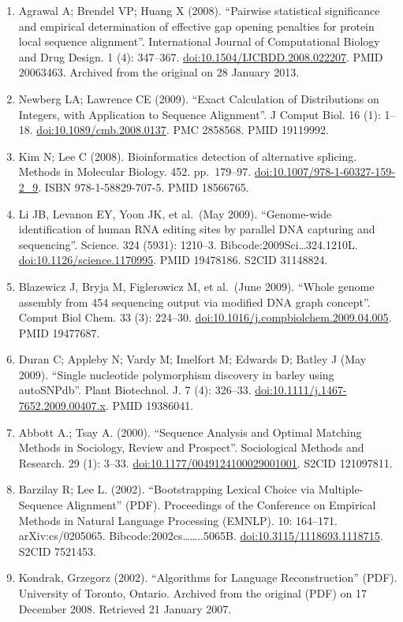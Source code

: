 \documentclass[
]{book}
\begin{document}
\begin{enumerate}
\item
  Agrawal A; Brendel VP; Huang X (2008). ``Pairwise statistical significance and empirical determination of effective gap opening penalties for protein local sequence alignment''. International Journal of Computational Biology and Drug Design. 1 (4): 347--367. \url{doi:10.1504/IJCBDD.2008.022207}. PMID 20063463. Archived from the original on 28 January 2013.
\item
  Newberg LA; Lawrence CE (2009). ``Exact Calculation of Distributions on Integers, with Application to Sequence Alignment''. J Comput Biol. 16 (1): 1--18. \url{doi:10.1089/cmb.2008.0137}. PMC 2858568. PMID 19119992.
\item
  Kim N; Lee C (2008). Bioinformatics detection of alternative splicing. Methods in Molecular Biology. 452. pp.~179--97. \url{doi:10.1007/978-1-60327-159-2_9}. ISBN 978-1-58829-707-5. PMID 18566765.
\item
  Li JB, Levanon EY, Yoon JK, et al.~(May 2009). ``Genome-wide identification of human RNA editing sites by parallel DNA capturing and sequencing''. Science. 324 (5931): 1210--3. Bibcode:2009Sci\ldots324.1210L. \url{doi:10.1126/science.1170995}. PMID 19478186. S2CID 31148824.
\item
  Blazewicz J, Bryja M, Figlerowicz M, et al.~(June 2009). ``Whole genome assembly from 454 sequencing output via modified DNA graph concept''. Comput Biol Chem. 33 (3): 224--30. \url{doi:10.1016/j.compbiolchem.2009.04.005}. PMID 19477687.
\item
  Duran C; Appleby N; Vardy M; Imelfort M; Edwards D; Batley J (May 2009). ``Single nucleotide polymorphism discovery in barley using autoSNPdb''. Plant Biotechnol. J. 7 (4): 326--33. \url{doi:10.1111/j.1467-7652.2009.00407.x}. PMID 19386041.
\item
  Abbott A.; Tsay A. (2000). ``Sequence Analysis and Optimal Matching Methods in Sociology, Review and Prospect''. Sociological Methods and Research. 29 (1): 3--33. \url{doi:10.1177/0049124100029001001}. S2CID 121097811.
\item
  Barzilay R; Lee L. (2002). ``Bootstrapping Lexical Choice via Multiple-Sequence Alignment'' (PDF). Proceedings of the Conference on Empirical Methods in Natural Language Processing (EMNLP). 10: 164--171. arXiv:cs/0205065. Bibcode:2002cs\ldots\ldots..5065B. \url{doi:10.3115/1118693.1118715}. S2CID 7521453.
\item
  Kondrak, Grzegorz (2002). ``Algorithms for Language Reconstruction'' (PDF). University of Toronto, Ontario. Archived from the original (PDF) on 17 December 2008. Retrieved 21 January 2007.

\end{enumerate}
\end{document}
